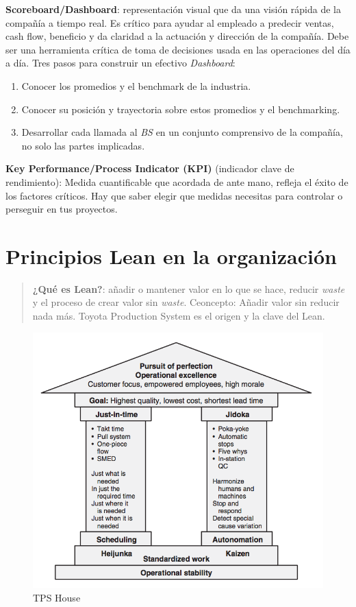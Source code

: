 \documentclass[oneside]{book}
\begin{document}
\textbf{Scoreboard/Dashboard}: representación visual que da una visión rápida de la compañía a tiempo real. Es crítico para ayudar al empleado a predecir ventas, cash flow, beneficio y da claridad a la actuación y dirección de la compañía. Debe ser una herramienta crítica de toma de decisiones usada en las operaciones del día a día. Tres pasos para construir un efectivo \textit{Dashboard}: \begin{enumerate} \item Conocer los promedios y el benchmark de la industria. \item Conocer su posición y trayectoria sobre estos promedios y el benchmarking. \item Desarrollar cada llamada al \textit{BS} en un conjunto comprensivo de la compañía, no solo las partes implicadas. \end{enumerate}

\textbf{Key Performance/Process Indicator (KPI)} (indicador clave de rendimiento): Medida cuantificable que acordada de ante mano, refleja el éxito de los factores críticos. Hay que saber elegir que medidas necesitas para controlar o perseguir en tus proyectos. 

\chapter{Principios Lean en la organización}

\begin{quote} \textbf{¿Qué es Lean?}: añadir o mantener valor en lo que se hace, reducir \textit{waste} y el proceso de crear valor sin \textit{waste}. Ceoncepto: Añadir valor sin reducir nada más. Toyota Production System es el origen y la clave del Lean. \end{quote}

\begin{figure}[ht!]
	\centering
	\includegraphics[width=120mm]{imagenes/TPSHouse.png}
	\caption{TPS House}
	\label{fig:TPS House}
\end{figure}
\end{document}
